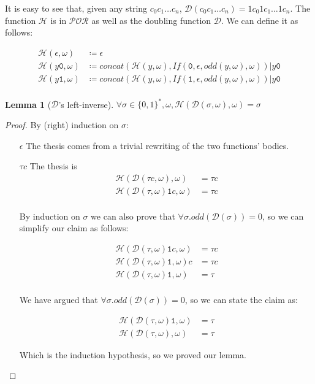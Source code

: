 \documentclass[10pt]{amsart}
\newcommand{\POR}{\mathcal{POR}}
\newcommand{\zero}{\mathtt{0}}
\newcommand{\one}{\mathtt{1}}
\newcommand{\vtwo}{y}
\newcommand{\mci}[1]{c_{#1}}
\newcommand{\oone}{\omega}
\newcommand{\db}{\mathcal D}
\newcommand{\hv}{\mathcal H}
\newtheorem{lemma}{Lemma}
\begin{document}
It is easy to see that, given any string $\mci 0\mci 1\ldots \mci n$, $\db(\mci 0\mci 1\ldots \mci n)=1\mci 0 1\mci 1\ldots 1 \mci n$. The function $\hv$ is in $\POR$ as well as the doubling function $\db$. We can define it as follows:

\begin{align*}
\hv (\epsilon, \oone)&\coloneqq \epsilon\\
\hv (\vtwo \zero, \oone)&\coloneqq concat(\hv(\vtwo, \oone), If(\zero, \epsilon, odd(\vtwo, \oone), \oone))|\vtwo\zero \\
\hv (\vtwo \one, \oone)&\coloneqq concat(\hv(\vtwo, \oone), If(\one, \epsilon,  odd(\vtwo, \oone), \oone))|\vtwo\zero\\
\end{align*}

\begin{lemma}[$\db$'s left-inverse]
$\forall \sigma \in \{0,1\}^*, \oone, \hv(\db(\sigma,\oone),\oone)=\sigma$
\end{lemma}

\begin{proof}
By (right) induction on $\sigma$:
\begin{itemize}
\item[$\epsilon$] The thesis comes from a trivial rewriting of the two functions' bodies.
\item[$\tau c$] The thesis is
\begin{align*}
\hv(\db(\tau c,\oone),\oone) &= \tau c\\
\hv(\db(\tau,\oone)\one c, \oone) &= \tau c\\
\end{align*}

By induction on $\sigma$ we can also prove that $\forall \sigma. odd(\db(\sigma))= 0$, so we can simplify our claim as follows:

\begin{align*}
\hv(\db(\tau,\oone)\one c, \oone) &= \tau c\\
\hv(\db(\tau,\oone)\one, \oone) c &= \tau c\\
\hv(\db(\tau,\oone)\one, \oone) &= \tau\\
\end{align*}

We have argued that $\forall \sigma. odd(\db(\sigma))= 0$, so we can state the claim as:

\begin{align*}
\hv(\db(\tau,\oone)\one, \oone) &= \tau\\
\hv(\db(\tau,\oone), \oone) &= \tau
\end{align*}

Which is the induction hypothesis, so we proved our lemma.
\end{itemize}
\end{proof}
\end{document}
